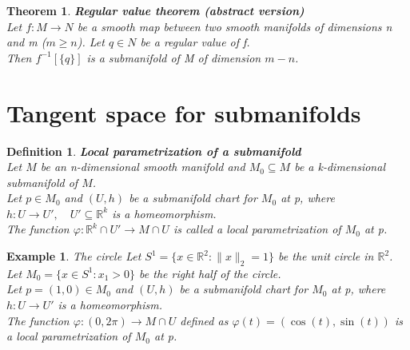 \documentclass[11pt]{book} %
\newtheorem{theorem}{Theorem}[section]
\newtheorem{definition}{Definition}[section]
\newtheorem*{example*}{Example}
\begin{document}
\begin{theorem}{\textbf{Regular value theorem (abstract version)}} \\
    Let \( f: M \to N \) be a smooth map between two smooth manifolds of dimensions n and m ($m \geq n$).
    Let \( q \in N \) be a regular value of f. \\
    Then \( f^{-1}[\{q\}] \) is a submanifold of M of dimension \( m - n \).
\end{theorem}


\section{Tangent space for submanifolds}

\begin{definition}{\textbf{Local parametrization of a submanifold}} \\
    Let \( M \) be an n-dimensional smooth manifold and \( M_0 \subseteq M \) be a k-dimensional submanifold of \( M \). \\
    Let \( p \in M_0 \) and \( (U, h) \) be a submanifold chart for \( M_0 \) at p, where \( h: U \to U', \quad U' \subseteq \mathbb{R}^k \) is a homeomorphism. \\
    The function \( \varphi : \mathbb{R}^k \cap U' \to M \cap U \) is called a local parametrization of \( M_0 \) at p.
\end{definition}

\begin{example*}The circle
    Let \( S^1 = \{ x \in \mathbb{R}^2 : \| x \|_2 = 1 \} \) be the unit circle in \( \mathbb{R}^2 \). \\
    Let \( M_0 = \{ x \in S^1 : x_1 > 0 \} \) be the right half of the circle. \\
    Let \( p = (1, 0) \in M_0 \) and \( (U, h) \) be a submanifold chart for \( M_0 \) at p, where \( h: U \to U' \) is a homeomorphism. \\
    The function \( \varphi : (0, 2\pi) \to M \cap U \) defined as \( \varphi(t) = (\cos(t), \sin(t)) \) is a local parametrization of \( M_0 \) at p.    
\end{example*}
\end{document}
